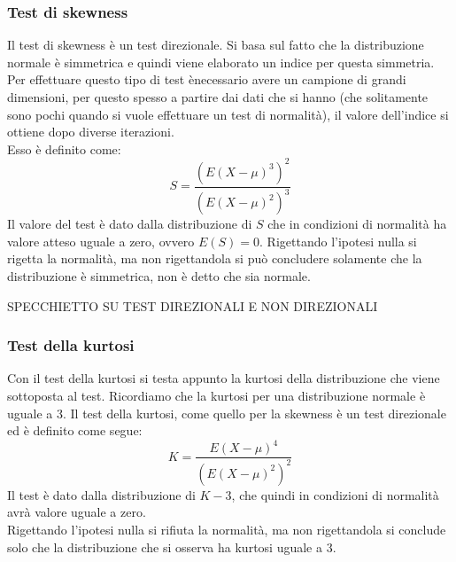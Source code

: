 \subsubsection{Test di skewness}
Il test di skewness è un test direzionale. Si basa sul fatto che la distribuzione normale è simmetrica e quindi viene elaborato un indice per questa simmetria. Per effettuare questo tipo di test  ènecessario avere un campione di grandi dimensioni, per questo spesso a partire dai dati che si hanno (che solitamente sono pochi quando si vuole effettuare un test di normalità), il valore dell'indice si ottiene dopo diverse iterazioni.\\
Esso è definito come: 
\begin{equation}
S = \frac{(E(X-\mu)^3)^2}{(E(X-\mu)^2)^3}
\end{equation}
Il valore del test è dato dalla distribuzione di $S$ che in condizioni di normalità ha valore atteso uguale a zero, ovvero $E(S) = 0$. Rigettando l'ipotesi nulla si rigetta la normalità, ma non rigettandola si può concludere solamente che la distribuzione è simmetrica, non è detto che sia normale.

SPECCHIETTO SU TEST DIREZIONALI E NON DIREZIONALI

\subsubsection{Test della kurtosi}
Con il test della kurtosi si testa appunto la kurtosi della distribuzione che viene sottoposta al test. Ricordiamo che la kurtosi per una distribuzione normale è uguale a 3. Il test della kurtosi, come quello per la skewness è un test direzionale ed è definito come segue:
\begin{equation}
K = \frac{E(X-\mu)^4}{(E(X-\mu)^2)^2}
\end{equation}
Il test è dato dalla distribuzione di $K-3$, che quindi in condizioni di normalità avrà valore uguale a zero.\\
Rigettando l'ipotesi nulla si rifiuta la normalità, ma non rigettandola si conclude solo che la distribuzione che si osserva ha kurtosi uguale a 3.

